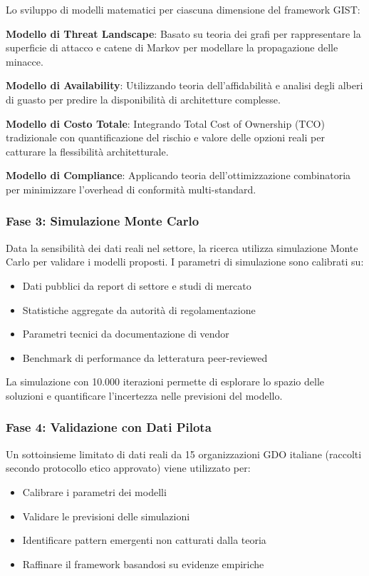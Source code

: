 Lo sviluppo di modelli matematici per ciascuna dimensione del framework GIST:

\textbf{Modello di Threat Landscape}: Basato su teoria dei grafi per rappresentare la superficie di attacco e catene di Markov per modellare la propagazione delle minacce.

\textbf{Modello di Availability}: Utilizzando teoria dell'affidabilità e analisi degli alberi di guasto per predire la disponibilità di architetture complesse.

\textbf{Modello di Costo Totale}: Integrando Total Cost of Ownership (TCO) tradizionale con quantificazione del rischio e valore delle opzioni reali per catturare la flessibilità architetturale.

\textbf{Modello di Compliance}: Applicando teoria dell'ottimizzazione combinatoria per minimizzare l'overhead di conformità multi-standard.

\subsubsection{Fase 3: Simulazione Monte Carlo}

Data la sensibilità dei dati reali nel settore, la ricerca utilizza simulazione Monte Carlo per validare i modelli proposti. I parametri di simulazione sono calibrati su:
\begin{itemize}
\item Dati pubblici da report di settore e studi di mercato
\item Statistiche aggregate da autorità di regolamentazione
\item Parametri tecnici da documentazione di vendor
\item Benchmark di performance da letteratura peer-reviewed
\end{itemize}

La simulazione con 10.000 iterazioni permette di esplorare lo spazio delle soluzioni e quantificare l'incertezza nelle previsioni del modello.

\subsubsection{Fase 4: Validazione con Dati Pilota}

Un sottoinsieme limitato di dati reali da 15 organizzazioni GDO italiane (raccolti secondo protocollo etico approvato) viene utilizzato per:
\begin{itemize}
\item Calibrare i parametri dei modelli
\item Validare le previsioni delle simulazioni
\item Identificare pattern emergenti non catturati dalla teoria
\item Raffinare il framework basandosi su evidenze empiriche
\end{itemize}

